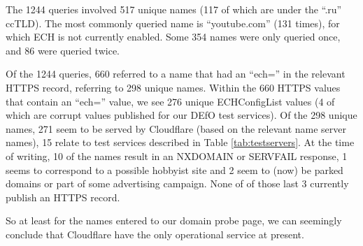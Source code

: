 The 1244 queries involved 517 unique names (117 of which are under
the ``.ru'' ccTLD). The most commonly queried name is ``youtube.com'' (131 times),
for which ECH is not currently enabled. Some 354 names were only queried 
once, and 86 were queried twice.

Of the 1244 queries, 660 referred to a name that had an ``ech='' in
the relevant HTTPS record, referring to 298 unique names.  Within the 660 HTTPS 
values that contain an ``ech='' value, we see 276 unique ECHConfigList values (4 of which are
corrupt values published for our DEfO test services).  Of the 298 unique
names, 271 seem to be served by Cloudflare (based on the relevant name server
names), 15 relate to test services described in Table \ref{tab:testservers}. At
the time of writing, 10 of the names result in an NXDOMAIN or SERVFAIL
response, 1 seems to correspond to a possible hobbyist site and 2 seem to (now)
be parked domains or part of some advertising campaign. None of of those last
3 currently publish an HTTPS record.

So at least for the names entered to our domain probe page, we can seemingly
conclude that Cloudflare have the only operational service at present.
